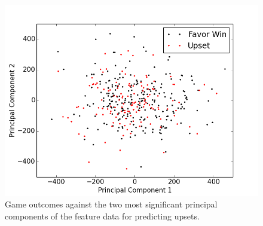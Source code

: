 \documentclass[12pt]{article}
\begin{document}
\begin{figure}[h!]
	\begin{center}
		\includegraphics[scale=0.45]{figs/pca2.png}
	\end{center}
	\caption{Game outcomes against the two most significant principal components of the feature data for predicting upsets.}
	\label{fig::pca2}
\end{figure}
\end{document}
